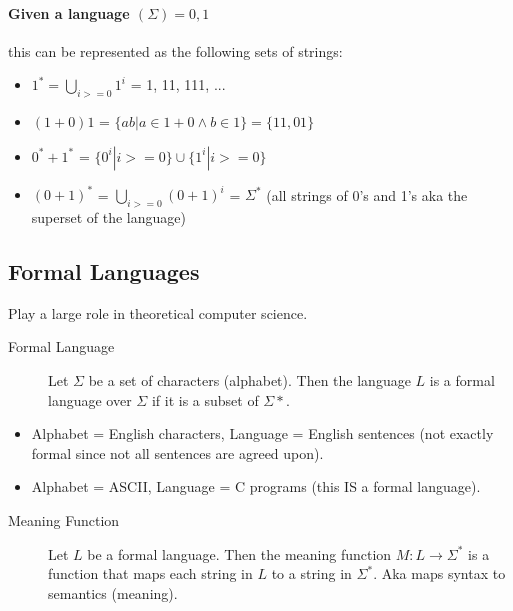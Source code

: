 \documentclass[a4paper, 10pt]{article}
\begin{document}
\paragraph{Given a language $(\Sigma) = {0,1}$} this can be represented as the following sets of strings:
\begin{itemize}
	\item $1^* = \bigcup_{i>=0}1^i$ = {1, 11, 111, ...}
	\item $(1+0)1$ = $\{ab | a \in 1+0  \land b \in 1\} = \{11,01\}$
	\item $0^*+1^*$ = $\{0^i | i >= 0\} \cup \{1^i | i >= 0\}$
	\item $(0+1)^*$ = $ \bigcup_{i>=0}(0+1)^i $ = $\Sigma^*$ (all strings of 0's and 1's aka the superset of the language)
\end{itemize}
\subsection{Formal Languages}
Play a large role in theoretical computer science.
\begin{description}
	\item[Formal Language] Let $\Sigma$ be a set of characters (alphabet). Then the language $L$ is a formal language over $\Sigma$ if it is a subset of $\Sigma*$.
\end{description}
\begin{itemize}
	\item Alphabet = English characters, Language = English sentences (not exactly formal since not all sentences are agreed upon).
	\item Alphabet = ASCII, Language = C programs (this IS a formal language).
\end{itemize}
\begin{description}
	\item[Meaning Function] Let $L$ be a formal language. Then the meaning function $M : L \rightarrow \Sigma^*$ is a function that maps each string in $L$ to a string in $\Sigma^*$. Aka maps syntax to semantics (meaning).
\end{description}
\end{document}
